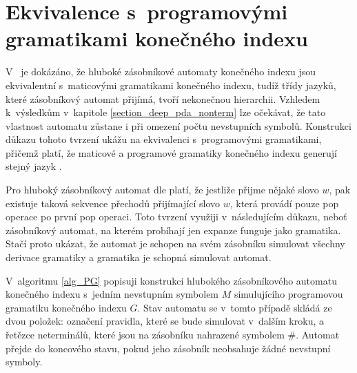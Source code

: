 \section{Ekvivalence s~programovými gramatikami konečného indexu}

V~\cite{Meduna:FinitelyDeepPDA} je dokázáno, že hluboké zásobníkové automaty konečného indexu jsou ekvivalentní s~maticovými gramatikami konečného indexu, tudíž třídy jazyků, které zásobníkový automat přijímá, tvoří nekonečnou hierarchii. Vzhledem k~výsledkům v~kapitole \ref{section_deep_pda_nonterm} lze očekávat, že tato vlastnost automatu zůstane i při omezení počtu nevstupních symbolů. Konstrukci důkazu tohoto tvrzení ukážu na ekvivalenci s~programovými gramatikami, přičemž platí, že maticové a programové gramatiky konečného indexu generují stejný jazyk \cite{Dassow:RegulatedRewriting}.

Pro hluboký zásobníkový automat dle \cite{Meduna:FinitelyDeepPDA} platí, že jestliže přijme nějaké slovo $w$, pak existuje taková sekvence přechodů přijímající slovo $w$, která provádí pouze pop operace po první pop operaci. Toto tvrzení využiji v~následujícím důkazu, neboť zásobníkový automat, na kterém probíhají jen expanze funguje jako gramatika. Stačí proto ukázat, že automat je schopen na svém zásobníku simulovat všechny derivace gramatiky a gramatika je schopná simulovat automat.

V~algoritmu \ref{alg_PG} popisuji konstrukci hlubokého zásobníkového automatu konečného indexu s~jedním nevstupním symbolem $M$ simulujícího programovou gramatiku konečného indexu $G$. Stav automatu se v~tomto případě skládá ze dvou položek: označení pravidla, které se bude simulovat v~dalším kroku, a řetězce neterminálů, které jsou na zásobníku nahrazené symbolem $\#$. Automat přejde do koncového stavu, pokud jeho zásobník neobsahuje žádné nevstupní symboly.

